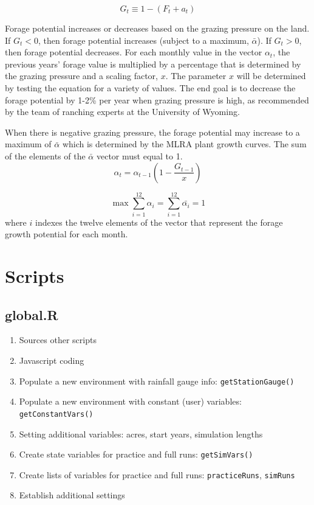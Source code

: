 \documentclass[11pt]{article}
\begin{document}
\begin{equation}
G_t \equiv 1 - (F_t + a_t)
\end{equation}

Forage potential increases or decreases based on the grazing pressure on the land. If $G_t < 0$, then forage potential increases (subject to a maximum, $\bar{\alpha}$). If $G_t > 0$, then forage potential decreases. For each monthly value in the vector $\alpha_{t}$, the previous years' forage value is multiplied by a percentage that is determined by the grazing pressure and a scaling factor, $x$. The parameter $x$ will be determined by testing the equation for a variety of values. The end goal is to decrease the forage potential by 1-2\% per year when grazing pressure is high, as recommended by the team of ranching experts at the University of Wyoming. 

When there is negative grazing pressure, the forage potential may increase to a maximum of $\bar{\alpha}$ which is determined by the MLRA plant growth curves. The sum of the elements of the $\bar{\alpha}$ vector must equal to 1.
\begin{equation}
\alpha_t = \alpha_{t-1} \left(1 - \frac{G_{t-1}}{x}\right)
\end{equation}

\begin{equation}
\max \sum_{i=1}^{12} \alpha_{i} = \sum_{i=1}^{12} \bar{\alpha_{i}} = 1 
\end{equation}
where $i$ indexes the twelve elements of the vector that represent the forage growth potential for each month.
\newpage

\section{Scripts}

\subsection{global.R}
\begin{enumerate}
\item Sources other scripts
\item Javascript coding
\item Populate a new environment with rainfall gauge info: \verb!getStationGauge()!
\item Populate a new environment with constant (user) variables: \verb!getConstantVars()!
\item Setting additional variables: acres, start years, simulation lengths
\item Create state variables for practice and full runs: \verb!getSimVars()!
\item Create lists of variables for practice and full runs: \verb!practiceRuns!, \verb!simRuns!
\item Establish additional settings
\end{enumerate}  
 
\end{document}
